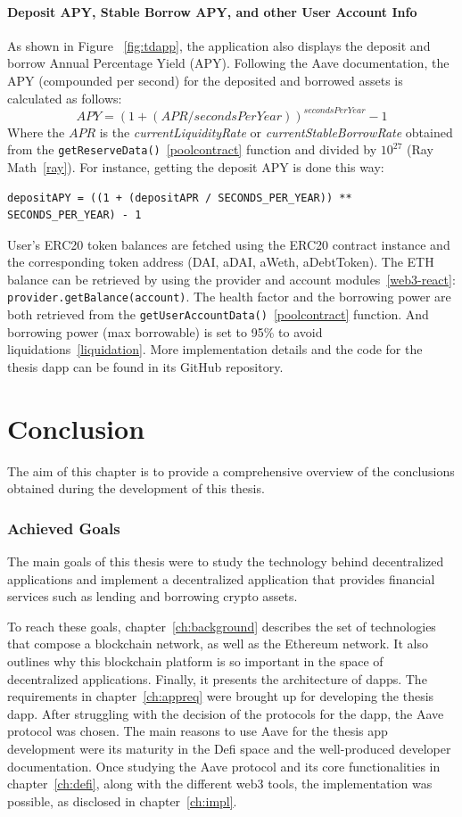 \documentclass[11pt,a4paper]{report}
\begin{document}
\subsubsection{Deposit APY, Stable Borrow APY, and other User Account Info}\label{accountinfo}
As shown in Figure ~\ref{fig:tdapp}, the application also displays the deposit and borrow Annual Percentage Yield (APY). Following the Aave documentation\cite{apr-apy}, the APY (compounded per second) for the deposited and borrowed assets is calculated as follows:\[ APY = (1 + ({APR}/{secondsPerYear}) )^{secondsPerYear} -1\]
Where the $APR$ is the \textit{currentLiquidityRate} or \textit{currentStableBorrowRate} obtained from the \verb|getReserveData()|~\ref{poolcontract} function and divided by $10^{27}$ (Ray Math~\ref{ray}). For instance, getting the deposit APY is done this way:
\begin{lstlisting}[frame=single]
depositAPY = ((1 + (depositAPR / SECONDS_PER_YEAR)) ** SECONDS_PER_YEAR) - 1
\end{lstlisting}
User's ERC20 token balances are fetched using the ERC20 contract instance and the corresponding token address (DAI, aDAI, aWeth, aDebtToken). The ETH balance can be retrieved by using the provider and account modules~\ref{web3-react}: \\\verb|provider.getBalance(account)|. The health factor and the borrowing power are both retrieved from the \verb|getUserAccountData()|~\ref{poolcontract} function. And borrowing power (max borrowable) is set to 95\% to avoid liquidations~\ref{liquidation}. More implementation details and the code for the thesis dapp can be found in its GitHub repository\cite{thesisDappRepo}.
\chapter{Conclusion} \label{ch:conclusion}
The aim of this chapter is to provide a comprehensive overview of the conclusions obtained during the development of this thesis.

\subsection{Achieved Goals}
The main goals of this thesis were to study the technology behind decentralized applications and implement a decentralized application that provides financial services such as lending and borrowing crypto assets.

To reach these goals, chapter~\ref{ch:background} describes the set of technologies that compose a blockchain network, as well as the Ethereum network. It also outlines why this blockchain platform is so important in the space of decentralized applications. Finally, it presents the architecture of dapps. The requirements in chapter~\ref{ch:appreq} were brought up for developing the thesis dapp. After struggling with the decision of the protocols for the dapp, the Aave protocol was chosen. The main reasons to use Aave for the thesis app development were its maturity in the Defi space and the well-produced developer documentation. Once studying the Aave protocol and its core functionalities in chapter~\ref{ch:defi}, along with the different web3 tools, the implementation was possible, as disclosed in chapter~\ref{ch:impl}.
\end{document}
